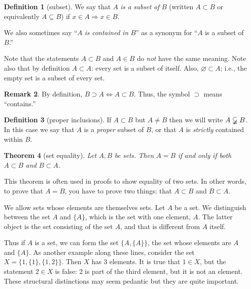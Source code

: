 \documentclass[11pt]{article}
\newtheorem{thm}{Theorem}[section]
\theoremstyle{definition}
\newtheorem{defn}[thm]{Definition}
\newtheorem{rmk}[thm]{Remark}
\renewcommand{\implies}{\Rightarrow}
\renewcommand{\iff}{\Leftrightarrow}
\begin{document}
\begin{defn}[subset]
  We say that $A$ \emph{is a subset of} $B$ (written $A
  \subset B$ or equivalently $A \subseteq B$) if $x \in A \implies x
  \in B$.
\end{defn}

We also sometimes say ``$A$ \emph{is contained in} $B$'' as a synonym
for ``$A$ is a subset of $B$.''

Note that the statements $A\subset B$ and $A\in B$ do \emph{not} have
the same meaning.  Note also that by definition $A\subset A$: every
set is a subset of itself.  Also, $\varnothing \subset A$; i.e., the
empty set is a subset of every set.

\begin{rmk} 
  By definition, $B \supset A \iff A \subset B$. Thus, the symbol
  $\supset$ means ``contains.''
\end{rmk}

\begin{defn}[proper inclusions]
  If $A \subset B$ but $A \ne B$ then we will write $A \varsubsetneqq
  B$. In this case we say that $A$ is a {\em proper} subset of $B$, or
  that $A$ is {\em strictly} contained within $B$.
\end{defn}


\begin{thm}[set equality]
  Let $A, B$ be sets. Then $A=B$ if and only if both
  $A \subset B$ and $B \subset A$.
\end{thm}

This theorem is often used in proofs to show equality of two sets. In
other words, to prove that $A = B$, you have to prove two things: that
$A \subset B$ and $B \subset A$.


We allow sets whose elements are themselves sets. Let $A$ be a set.
We distinguish between the set $A$ and $\{A\}$, which is the set with
one element, $A$. The latter object is the set consisting of the set
$A$, and that is different from $A$ itself.  

Thus if $A$ is a set, we can form the set $\{A, \{A\} \}$, the set
whose elements are $A$ and $\{A\}$.  As another example along these
lines, consider the set $X=\{1, \{1\}, \{1,2\} \}$.  Then $X$ has 3
elements. It is true that $1\in X$, but the statement $2\in X$ is
false: 2 is part of the third element, but it is not an element. These
structural distinctions may seem pedantic but they are quite
important.
\end{document}
